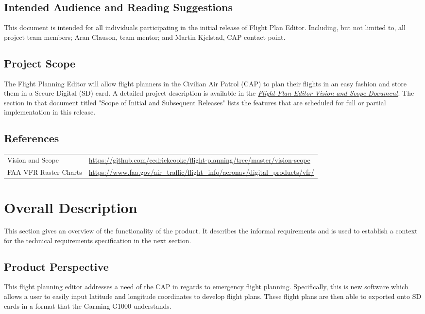 \documentclass[12pt, letterpaper]{article}
\begin{document}
\subsection{Intended Audience and Reading Suggestions}
This document is intended for all individuals participating in the initial release of Flight Plan Editor.
Including, but not limited to, all project team members; Aran Clauson, team mentor; and Martin Kjelstad, CAP contact point.

\subsection{Project Scope}
The Flight Planning Editor will allow flight planners in the Civilian Air Patrol (CAP)
to plan their flights in an easy fashion and store them in a Secure Digital (SD) card.
A detailed project description is available in the \hyperref[sec:ref]{\textit{Flight Plan Editor Vision and Scope Document}}.
The section in that document titled "Scope of Initial and Subsequent Releases" lists the features that are scheduled for full or partial implementation in this release.

\subsection{References}\label{sec:ref}
\begin{tabularx}{\textwidth}{l|X} \hline
Vision and Scope & \url{https://github.com/cedrickcooke/flight-planning/tree/master/vision-scope} \\
FAA VFR Raster Charts & \url{https://www.faa.gov/air_traffic/flight_info/aeronav/digital_products/vfr/} \\ \hline
\end{tabularx}

\pagebreak
\section{Overall Description}
This section gives an overview of the functionality of the product.
It describes the informal requirements and is used to establish a context for the technical
requirements specification in the next section.

\subsection{Product Perspective}
This flight planning editor addresses a need of the CAP in regards to emergency flight planning.
Specifically, this is new software which allows a user to easily input latitude and longitude coordinates to develop flight plans.
These flight plans are then able to exported onto SD cards in a format that the Garming G1000 understands.
\end{document}
